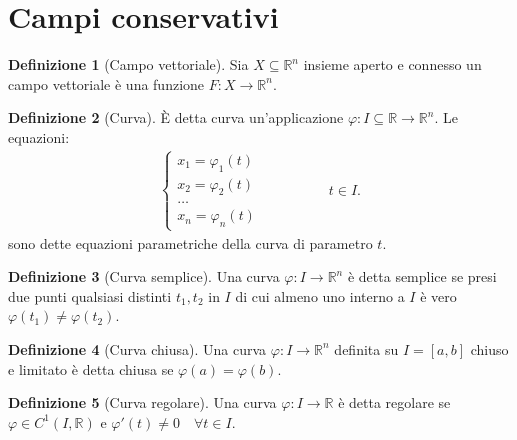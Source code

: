 \documentclass[leqno]{article}
\theoremstyle{definition}
\newtheorem{definition}{Definizione}[section]
\numberwithin{equation}{section}
\theoremstyle{remark}
\begin{document}
	\section{Campi conservativi}
	
	\begin{definition}[Campo vettoriale]
		Sia $X \subseteq \mathbb{R}^n$ insieme aperto e connesso un campo vettoriale è una funzione $F:X \to \mathbb{R}^n$.
	\end{definition}
	
	\begin{definition}[Curva]
		È detta curva un'applicazione $\varphi : I \subseteq \mathbb{R} \to \mathbb{R}^n$. Le equazioni:
		\begin{equation}
			\begin{split}
				\begin{cases}
					x_1= \varphi_1 (t)\\
					x_2= \varphi_2 (t)\\
					\dots \\
					x_n= \varphi_n (t)
				\end{cases}
			\end{split}
			\begin{split}
				\quad \quad \quad \quad 
				t \in I.
			\end{split}
		\end{equation}
		sono dette equazioni parametriche della curva di parametro $t$.
	\end{definition}
	
	\begin{definition}[Curva semplice]
		Una curva $\varphi: I \to \mathbb{R}^n$ è detta semplice se presi due punti qualsiasi distinti $t_1, t_2$ in $I$ di cui almeno uno interno a $I$ è vero $\varphi(t_1)\neq \varphi(t_2)$.
	\end{definition}    
	
	\begin{definition}[Curva chiusa]
		Una curva $\varphi: I \to \mathbb{R}^n$ definita su $I=[a,b]$ chiuso e limitato è detta chiusa se $\varphi(a)=\varphi(b)$. 
	\end{definition}
	
	\begin{definition}[Curva regolare]
		Una curva $\varphi: I \to \mathbb{R}$ è detta regolare se $\varphi \in C^1(I,\mathbb{R}) $ e $\varphi '(t) \neq 0 \quad \forall t \in I.$
	\end{definition}
	
\end{document}
